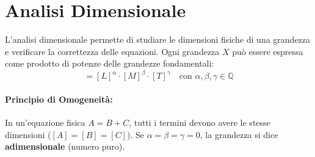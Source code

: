 \section{Analisi Dimensionale}
L'analisi dimensionale permette di studiare le dimensioni fisiche di una grandezza e verificare la correttezza delle equazioni. Ogni grandezza $X$ può essere espressa come prodotto di potenze delle grandezze fondamentali:
\begin{equation}
    [X] = [L]^\alpha \cdot [M]^\beta \cdot [T]^\gamma \quad \text{con } \alpha, \beta, \gamma \in \mathbb{Q}
\end{equation}

\paragraph{Principio di Omogeneità:} In un'equazione fisica $A = B + C$, tutti i termini devono avere le stesse dimensioni ($[A] = [B] = [C]$).
Se $\alpha=\beta=\gamma=0$, la grandezza si dice \textbf{adimensionale} (numero puro).

